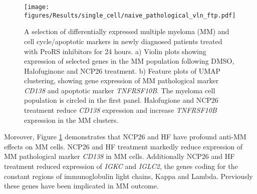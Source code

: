 %
\begin{figure}[htb]
\centering
\texttt{[image: figures/Results/single\_cell/naive\_pathological\_vln\_ftp.pdf]}
\caption[scRNA-seq differentially expressed MM markers- newly diagnosed patients]{A selection of differentially expressed multiple myeloma (MM) and cell cycle/apoptotic markers in newly diagnosed patients treated with ProRS inhibitors for 24 hours.
    a) Violin plots showing expression of selected genes in the MM population following DMSO, Halofuginone and NCP26 treatment.
    b) Feature plots of UMAP clustering, showing gene expression of MM pathological marker \textit{CD138} and apoptotic marker \textit{TNFRSF10B}.
The myeloma cell population is circled in the first panel.
Halofugione and NCP26 treatment reduce \textit{CD138} expression and increase \textit{TNFRSF10B} expression in the MM clusters.}
\label{fig:naive_path_vln_ftp}
\end{figure}

Moreover, Figure \ref{fig:naive_path_vln_ftp} demonstrates that NCP26 and HF have profound anti-MM effects on MM cells.
NCP26 and HF treatment markedly reduce expression of MM pathological marker \textit{CD138} in MM cells.
Additionally NCP26 and HF treatment reduced expression of \textit{IGKC} and \textit{IGLC2}, the genes coding for the constant regions of immunoglobulin light chains, Kappa and Lambda.
Previously these genes have been implicated in MM outcome.


\clearpage
